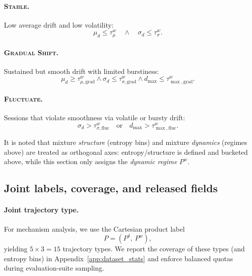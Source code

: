 \paragraph{\textsc{Stable}.}
Low average drift and low volatility:
\begin{equation}
\label{eq:mix_stable}
\mu_d \le \tau_{\mu}^{w}
\quad \wedge \quad
\sigma_d \le \tau_{\sigma}^{w}.
\end{equation}

\paragraph{\textsc{Gradual Shift}.}
Sustained but smooth drift with limited burstiness:
\begin{equation}
\label{eq:mix_gradual}
\mu_d \ge \tau_{\mu,\mathrm{grad}}^{w}
\wedge
\sigma_d \le \tau_{\sigma,\mathrm{grad}}^{w}
\wedge
d_{\max} \le \tau_{\max,\mathrm{grad}}^{w}.
\end{equation}

\paragraph{\textsc{Fluctuate}.}
Sessions that violate smoothness via volatile or bursty drift:
\begin{equation}
\label{eq:mix_fluct}
\sigma_d > \tau_{\sigma,\mathrm{fluc}}^{w}
\quad \text{or} \quad
d_{\max} > \tau_{\max,\mathrm{fluc}}^{w}.
\end{equation}

It is noted that mixture \emph{structure} (entropy bins) and mixture \emph{dynamics} (regimes above) are treated as orthogonal axes: entropy/structure is defined and bucketed above, while this section only assigns the \emph{dynamic regime} $P^w$.

\subsection{Joint labels, coverage, and released fields}
\label{app:pattern_joint}

\paragraph{Joint trajectory type.}
For mechanism analysis, we use the Cartesian product label
\begin{equation}
\label{eq:joint_label}
P = \left(P^\delta,\ P^w\right), 
\end{equation}
yielding $5\times 3=15$ trajectory types.
We report the coverage of these types (and entropy bins) in Appendix~\ref{app:dataset_stats} and enforce balanced quotas during evaluation-suite sampling.

